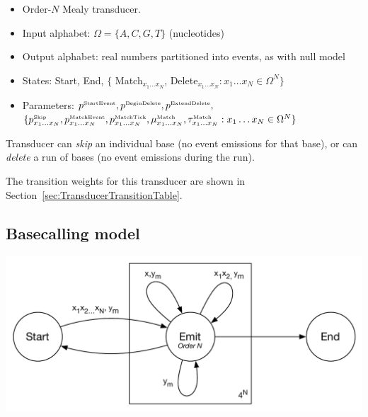 \documentclass[10pt]{article}
\newcommand{\secref}[1]{Section~\ref{sec:#1}}
\newcommand{\seclabel}[1]{\label{sec:#1}}
\begin{document}
\begin{itemize}
\item Order-$N$ Mealy transducer.
\item Input alphabet: $\Omega = \{ A, C, G, T \}$ (nucleotides)
\item Output alphabet: real numbers partitioned into events, as with null model
\item States: Start, End, $\{$ Match${}_{x_1 \ldots x_N}$, Delete${}_{x_1 \ldots x_N}: x_1 \ldots x_N \in \Omega^N \}$
\item Parameters:
$p^{\mbox{\tiny StartEvent}}, p^{\mbox{\tiny BeginDelete}}, p^{\mbox{\tiny ExtendDelete}},$ \\
$\{ p^{\mbox{\tiny Skip}}_{x_1\ldots x_N}, p^{\mbox{\tiny MatchEvent}}_{x_1\ldots x_N}, p^{\mbox{\tiny MatchTick}}_{x_1\ldots x_N}, \mu^{\mbox{\tiny Match}}_{x_1\ldots x_N},\tau^{\mbox{\tiny Match}}_{x_1\ldots x_N} : x_1 \ldots x_N \in \Omega^N \}$
\end{itemize}

Transducer can {\em skip} an individual base (no event emissions for that base),
or can {\em delete} a run of bases (no event emissions during the run).

The transition weights for this transducer are shown in \secref{TransducerTransitionTable}.




\subsection{Basecalling model}
\seclabel{BasecallingModel}

\includegraphics[width=\textwidth]{figs/HMM.pdf}
\end{document}
